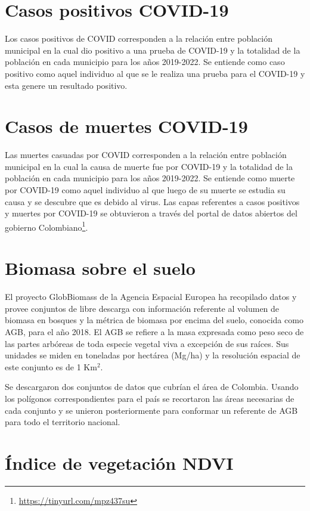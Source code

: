 \section{Casos positivos COVID-19}


Los casos positivos de COVID corresponden a la relación entre población municipal en la cual dio positivo a una prueba de COVID-19 y la totalidad de la 
población en cada municipio para los años 2019-2022. Se entiende como caso positivo como aquel individuo al que se le realiza una prueba para el COVID-19 y esta 
genere un resultado positivo.

\section{Casos de muertes COVID-19}

Las muertes casuadas por COVID corresponden a la relación entre población municipal en la cual la causa de muerte fue por COVID-19 y la totalidad de la 
población en cada municipio para los años 2019-2022.  Se entiende como muerte por COVID-19 como aquel individuo al que luego de su muerte se estudia su causa y 
se descubre que es debido al virus.  Las capas referentes a casos positivos y muertes por COVID-19 se obtuvieron a través del portal de datos abiertos del 
gobierno Colombiano\footnote{\url{https://tinyurl.com/mpz437su}}.

\section{Biomasa sobre el suelo}

El proyecto GlobBiomass \cite{santoro_globbiomass_2018, santoro_detailed_2018} de la Agencia Espacial Europea ha recopilado datos y provee conjuntos de libre 
descarga con información referente al volumen de biomasa en bosques y la métrica de biomasa por encima del suelo, conocida como AGB, para el año 2018.  El AGB 
se refiere a la masa expresada como peso seco de las partes arbóreas de toda especie vegetal viva a excepción de sus raíces.  Sus unidades se miden en toneladas 
por hectárea (Mg/ha) y la resolución espacial de este conjunto es de 1 Km$^2$.

Se descargaron dos conjuntos de datos que cubrían el área de Colombia.  Usando los polígonos correspondientes para el país se recortaron las áreas necesarias de 
cada conjunto y se unieron posteriormente para conformar un referente de AGB para todo el territorio nacional.

\section{Índice de vegetación NDVI}

